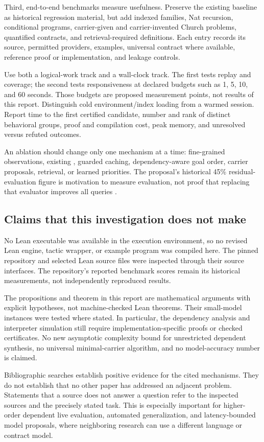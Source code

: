 \documentclass[11pt,a4paper]{article}
\newcommand{\code}[1]{\texttt{\detokenize{#1}}}
\theoremstyle{definition}
\theoremstyle{remark}
\begin{document}
Third, end-to-end benchmarks measure usefulness. Preserve the existing baseline
as historical regression material, but add indexed families, Nat recursion,
conditional programs, carrier-given and carrier-invented Church problems,
quantified contracts, and retrieval-required definitions. Each entry records
its source, permitted providers, examples, universal contract where available,
reference proof or implementation, and leakage controls.

Use both a logical-work track and a wall-clock track. The first tests replay and
coverage; the second tests responsiveness at declared budgets such as 1, 5, 10,
and 60 seconds. Those budgets are proposed measurement points, not results of
this report. Distinguish cold environment/index loading from a warmed session.
Report time to the first certified candidate, number and rank of distinct
behavioral groups, proof and compilation cost, peak memory, and unresolved
versus refuted outcomes.

An ablation should change only one mechanism at a time: fine-grained
observations, existing \code{cbv}, guarded caching, dependency-aware goal order,
carrier proposals, retrieval, or learned priorities. The proposal's historical
45\% residual-evaluation figure is motivation to measure evaluation, not proof
that replacing that evaluator improves all queries \cite{repo}.

\subsection{Claims that this investigation does not make}
No Lean executable was available in the execution environment, so no revised
Lean engine, tactic wrapper, or example program was compiled here. The pinned
repository and selected Lean source files were inspected through their source
interfaces. The repository's reported benchmark scores remain its historical
measurements, not independently reproduced results.

The propositions and theorem in this report are mathematical arguments with
explicit hypotheses, not machine-checked Lean theorems. Their small-model
instances were tested where stated. In particular, the dependency analysis and
interpreter simulation still require implementation-specific proofs or checked
certificates. No new asymptotic complexity bound for unrestricted dependent
synthesis, no universal minimal-carrier algorithm, and no model-accuracy number
is claimed.

Bibliographic searches establish positive evidence for the cited mechanisms.
They do not establish that no other paper has addressed an adjacent problem.
Statements that a source does not answer a question refer to the inspected
sources and the precisely stated task. This is especially important for
higher-order dependent live evaluation, automated generalization, and
latency-bounded model proposals, where neighboring research can use a different
language or contract model.
\end{document}
